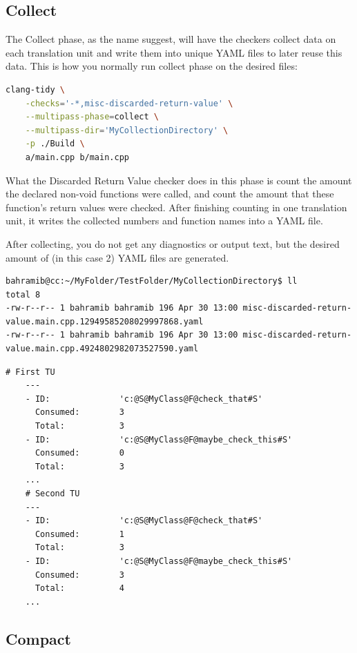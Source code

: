 \subsection{Collect}

The Collect phase, as the name suggest, will have the checkers collect data on each translation unit and write them into unique YAML
files to later reuse this data. This is how you normally run collect phase on the desired files:

\begin{lstlisting}[language={bash}]
	clang-tidy \
	-checks='-*,misc-discarded-return-value' \
	--multipass-phase=collect \
	--multipass-dir='MyCollectionDirectory' \
	-p ./Build \
	a/main.cpp b/main.cpp
\end{lstlisting}

What the Discarded Return Value checker does in this phase is count the amount the declared non-void functions were called,
and count the amount that these function's return values were checked. After finishing counting in one translation unit, it writes the
collected numbers and function names into a YAML file.  
\par After collecting, you do not get any diagnostics or output text, but the desired amount of (in this case 2) YAML files are generated.

\begin{lstlisting}[caption={The YAML files containing the collection data.},captionpos=b]
bahramib@cc:~/MyFolder/TestFolder/MyCollectionDirectory$ ll
total 8
-rw-r--r-- 1 bahramib bahramib 196 Apr 30 13:00 misc-discarded-return-value.main.cpp.12949585208029997868.yaml
-rw-r--r-- 1 bahramib bahramib 196 Apr 30 13:00 misc-discarded-return-value.main.cpp.4924802982073527590.yaml
\end{lstlisting}

\begin{lstlisting}[caption={Contents of the collection files.},captionpos=b]
	# First TU
	---
	- ID:              'c:@S@MyClass@F@check_that#S'
	  Consumed:        3
	  Total:           3
	- ID:              'c:@S@MyClass@F@maybe_check_this#S'
	  Consumed:        0
	  Total:           3
	...
	# Second TU
	---
	- ID:              'c:@S@MyClass@F@check_that#S'
	  Consumed:        1
	  Total:           3
	- ID:              'c:@S@MyClass@F@maybe_check_this#S'
	  Consumed:        3
	  Total:           4
	...
\end{lstlisting}

\subsection{Compact}

